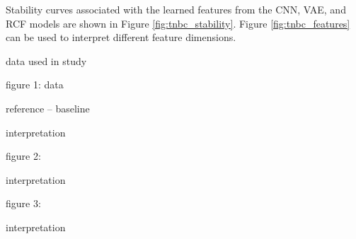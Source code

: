 Stability curves associated with the learned features from the CNN, VAE, and RCF
models are shown in Figure \ref{fig:tnbc_stability}. Figure
\ref{fig:tnbc_features} can be used to interpret different feature dimensions.



data used in study

figure 1: data

reference -- baseline

interpretation

figure 2:

interpretation

figure 3:

interpretation
